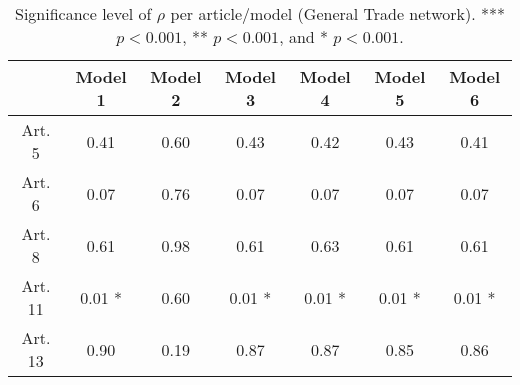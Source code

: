\begin{table}[ht]
\centering
\begin{tabular}{ccccccc}
  \toprule
 & Model 1 & Model 2 & Model 3 & Model 4 & Model 5 & Model 6 \\ 
  \midrule
Art. 5 & 0.41   & 0.60   & 0.43   & 0.42   & 0.43   & 0.41   \\ 
   \midrule
Art. 6 & 0.07   & 0.76   & 0.07   & 0.07   & 0.07   & 0.07   \\ 
   \midrule
Art. 8 & 0.61   & 0.98   & 0.61   & 0.63   & 0.61   & 0.61   \\ 
   \midrule
Art. 11 & 0.01 * & 0.60   & 0.01 * & 0.01 * & 0.01 * & 0.01 * \\ 
   \midrule
Art. 13 & 0.90   & 0.19   & 0.87   & 0.87   & 0.85   & 0.86   \\ 
   \bottomrule
\end{tabular}
\caption{Significance level of $\rho$ per article/model (General Trade network). *** $p < 0.001$, ** $p < 0.001$, and * $p < 0.001$.} 
\end{table}
